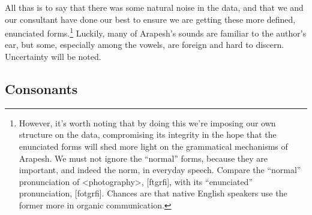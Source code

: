 \documentclass[pdftex,12pt,letterpaper]{article}
\let\ipa\textipa
\begin{document}
All thas is to say that there was some natural noise in the data, and that we and our consultant have done our best to ensure we are getting these more defined, enunciated forms.\footnote{However, it's worth noting that by doing this we're imposing our own structure on the data, compromising its integrity in the hope that the enunciated forms will shed more light on the grammatical mechanisms of Arapesh. We must not ignore the ``normal'' forms, because they are important, and indeed the norm, in everyday speech. Compare the ``normal'' pronunciation of \textless photography\textgreater, {[f\ipa{@}t\ipa{O}gr\ipa{@}fi]}, with its ``enunciated'' pronunciation, {[fot\ipa{O}gr\ipa{@}fi]}. Chances are that native English speakers use the former more in organic communication.} Luckily, many of Arapesh's sounds are familiar to the author's ear, but some, especially among the vowels, are foreign and hard to discern. Uncertainty will be noted.

\subsection{Consonants}
\end{document}
